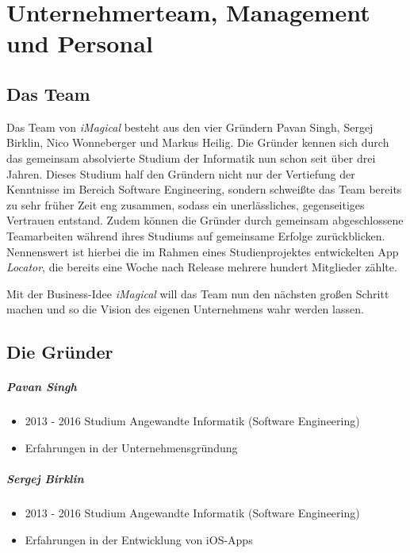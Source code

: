 \chapter{Unternehmerteam, Management und Personal}


\section{Das Team}

Das Team von \textit{iMagical} besteht aus den vier Gründern Pavan Singh, Sergej Birklin, Nico Wonneberger und Markus Heilig.
Die Gründer kennen sich durch das gemeinsam absolvierte Studium der Informatik nun schon seit über drei Jahren.
Dieses Studium half den Gründern nicht nur der Vertiefung der Kenntnisse im Bereich Software Engineering, sondern schweißte das Team bereits zu sehr früher Zeit eng zusammen, sodass ein unerlässliches, gegenseitiges Vertrauen entstand.
Zudem können die Gründer durch gemeinsam abgeschlossene Teamarbeiten während ihres Studiums auf gemeinsame Erfolge zurückblicken.
Nennenswert ist hierbei die im Rahmen eines Studienprojektes entwickelten App \textit{Locator}, die bereits eine Woche nach Release mehrere hundert Mitglieder zählte.

Mit der Business-Idee \textit{iMagical} will das Team nun den nächsten großen Schritt machen und so die Vision des eigenen Unternehmens wahr werden lassen.


\section{Die Gründer}

\paragraph{Pavan Singh}
\begin{itemize}
\item 2013 - 2016 Studium Angewandte Informatik (Software Engineering)
\item Erfahrungen in der Unternehmensgründung
\end{itemize}

\paragraph{Sergej Birklin}
\begin{itemize}
\item 2013 - 2016 Studium Angewandte Informatik (Software Engineering)
\item Erfahrungen in der Entwicklung von iOS-Apps
\end{itemize}

